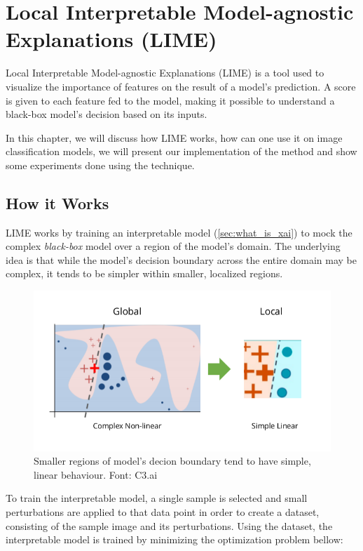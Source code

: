 \chapter{Local Interpretable Model-agnostic Explanations (LIME)}

Local Interpretable Model-agnostic Explanations (LIME) \citep{ribeiro2016whyitrustyou}  is a tool used to visualize the importance of features on the result of a model's prediction.
A score is given to each feature fed to the model, making it possible to understand a black-box model's decision based on its inputs. 

In this chapter, we will discuss how LIME works, how can one use it on image classification models, we will present our implementation of the method and show some experiments done using the technique. 

\section{How it Works}

LIME works by training an interpretable model (\ref{sec:what_is_xai}) to mock the complex \emph{black-box} model over a region of the model's domain.
The underlying idea is that while the model's decision boundary across the entire domain may be complex, it tends to be simpler within smaller, localized regions.

\begin{figure} 
    \centering
    \includegraphics[width=0.5\linewidth]{figuras/lime_regions.png}
    \caption{Smaller regions of model's decion boundary tend to have simple, linear behaviour. Font: C3.ai\footnotemark}
\end{figure}

To train the interpretable model, a single sample is selected and small perturbations are applied to that data point in order to create a dataset, consisting of the sample image and its perturbations.
Using the dataset, the interpretable model is trained by minimizing the optimization problem bellow:

